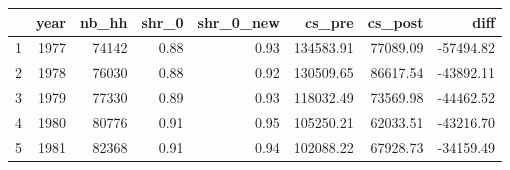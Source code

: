 \begin{tabular}{rrrrrrrr}
  \hline
 & year & nb\_hh & shr\_0 & shr\_0\_new & cs\_pre & cs\_post & diff \\ 
  \hline
1 & 1977 & 74142 & 0.88 & 0.93 & 134583.91 & 77089.09 & -57494.82 \\ 
  2 & 1978 & 76030 & 0.88 & 0.92 & 130509.65 & 86617.54 & -43892.11 \\ 
  3 & 1979 & 77330 & 0.89 & 0.93 & 118032.49 & 73569.98 & -44462.52 \\ 
  4 & 1980 & 80776 & 0.91 & 0.95 & 105250.21 & 62033.51 & -43216.70 \\ 
  5 & 1981 & 82368 & 0.91 & 0.94 & 102088.22 & 67928.73 & -34159.49 \\ 
   \hline
\end{tabular}
